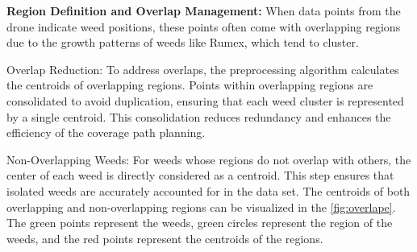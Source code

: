 \vspace{3mm}  


\textbf{Region Definition and Overlap Management: } When data points from the drone indicate weed positions, these points often come with overlapping regions due to the growth patterns of weeds like Rumex, which tend to cluster.

\vspace{3mm}  


Overlap Reduction: To address overlaps, the preprocessing algorithm calculates the centroids of overlapping regions. Points within overlapping regions are consolidated to avoid duplication, ensuring that each weed cluster is represented by a single centroid. This consolidation reduces redundancy and enhances the efficiency of the coverage path planning.

\vspace{3mm}  


Non-Overlapping Weeds: For weeds whose regions do not overlap with others, the center of each weed is directly considered as a centroid. This step ensures that isolated weeds are accurately accounted for in the data set. The centroids of both overlapping and non-overlapping regions can be visualized in the \autoref{fig:overlape}. The green points represent the weeds, green circles represent the region of the weeds, and the red points represent the centroids of the regions. 

